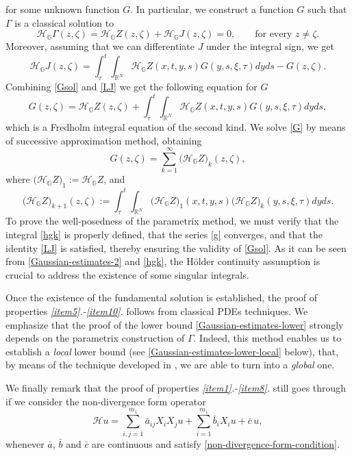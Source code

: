 \documentclass[11pt,a4paper]{article}
\numberwithin{equation}{section}
\def \rn {{\mathbb {R}}^{N}}
\def \GG {{\mathbb{G}}}
\def \h {\mathscr{H}}
\def \H {\mathscr{H}_\GG}
\def \G {{\Gamma}}
\def \t {{\tau}}
\def \x {{\xi}}
\def \z {{\zeta}}
\begin{document}
for some unknown function $G$. In particular, we construct a function $G$ such that $\G$ is a classical solution to
\begin{equation}\label{Gsol}
	\H\G(z,\z)=\H Z(z,\z)+\H J(z,\z)=0,\qquad \text{for every } z\neq \z.
\end{equation}
Moreover, assuming that we can differentiate $J$ under the integral sign, we get
\begin{equation}\label{LJ}
	\H J(z,\z)=\int_\t^t\int_{\rn} \H Z(x,t,y,s)G(y,s,\x,\t)dyds-G(z,\z).
\end{equation}
Combining \eqref{Gsol} and \eqref{LJ} we get the following equation for $G$
\begin{equation}\label{G}
	G(z,\z)= \H Z(z,\z) + \int_\t^t\int_{\rn} \H Z(x,t,y,s)G(y,s,\x,\t)dyds,
\end{equation}
which is a Fredholm integral equation of the second kind. We solve \eqref{G} by means of successive approximation method, obtaining
\begin{equation}\label{g}
	G(z,\z)=\sum_{k=1}^\infty \big(\H Z\big)_k(z,\z),
\end{equation}
where $\big(\H Z\big)_1:=\H Z$, and 
\begin{equation}\label{hgk}
	\big(\H Z\big)_{k+1}(z,\z):=\int_\t^t\int_{\rn} \big(\H Z\big)_1(x,t,y,s)\big(\H Z\big)_k(y,s,\x,\t)dyds.
\end{equation}
To prove the well-posedness of the parametrix method, we must verify that the integral \eqref{hgk} is properly defined, that the series \eqref{g} converges, and that the identity \eqref{LJ} is satisfied, thereby ensuring the validity of \eqref{Gsol}. As it can be seen from \eqref{Gaussian-estimates-2} and \eqref{hgk}, the H\"older continuity assumption is crucial to address the existence of some singular integrals. 


Once the existence of the fundamental solution is established, the proof of properties \emph{\ref{item5}.-\ref{item10}.} follows from classical PDEs techniques. We emphasize that the proof of the lower bound \eqref{Gaussian-estimates-lower} strongly depends on the parametrix  construction of $\G$. Indeed, this method enables us to establish a \emph{local} lower bound (see \eqref{Gaussian-estimates-lower-local} below), that, by means of the technique developed in \cite{jerison-calle}, we are able to turn into a \emph{global} one.

We finally remark that the proof of properties \emph{\ref{item1}.-\ref{item8}.} still goes through if we consider the non-divergence form operator
\begin{equation}\label{non-div}
	\h u = \sum_{i,j=1}^{m_1} \bar a_{ij}X_iX_ju+\sum_{i=1}^{m_1}\bar b_{i}X_iu+\bar c\,u,
\end{equation}
whenever $\bar a$, $\bar b$ and $\bar c$ are continuous and satisfy \eqref{non-divergence-form-condition}. 
\end{document}
